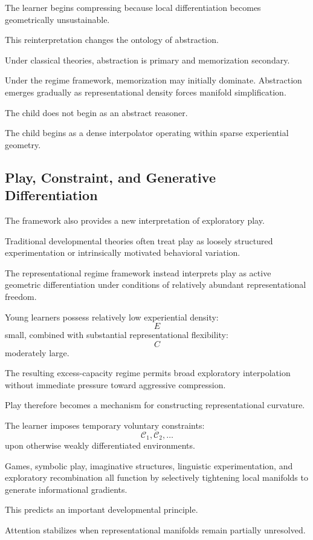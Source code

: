 \documentclass[12pt,a4paper]{article}
\begin{document}
The learner begins compressing because local differentiation becomes geometrically unsustainable.

This reinterpretation changes the ontology of abstraction.

Under classical theories, abstraction is primary and memorization secondary.

Under the regime framework, memorization may initially dominate. Abstraction emerges gradually as representational density forces manifold simplification.

The child does not begin as an abstract reasoner.

The child begins as a dense interpolator operating within sparse experiential geometry.

\subsection{Play, Constraint, and Generative Differentiation}

The framework also provides a new interpretation of exploratory play.

Traditional developmental theories often treat play as loosely structured experimentation or intrinsically motivated behavioral variation.

The representational regime framework instead interprets play as active geometric differentiation under conditions of relatively abundant representational freedom.

Young learners possess relatively low experiential density:
\[
E
\]
small,
combined with substantial representational flexibility:
\[
C
\]
moderately large.

The resulting excess-capacity regime permits broad exploratory interpolation without immediate pressure toward aggressive compression.

Play therefore becomes a mechanism for constructing representational curvature.

The learner imposes temporary voluntary constraints:
\[
\mathcal{C}_1,
\mathcal{C}_2,
\ldots
\]
upon otherwise weakly differentiated environments.

Games, symbolic play, imaginative structures, linguistic experimentation, and exploratory recombination all function by selectively tightening local manifolds to generate informational gradients.

This predicts an important developmental principle.

Attention stabilizes when representational manifolds remain partially unresolved.
\end{document}
